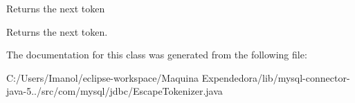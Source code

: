 Returns the next token

\begin{DoxyReturn}{Returns}
the next token. 
\end{DoxyReturn}


The documentation for this class was generated from the following file\+:\begin{DoxyCompactItemize}
\item 
C\+:/\+Users/\+Imanol/eclipse-\/workspace/\+Maquina Expendedora/lib/mysql-\/connector-\/java-\/5../src/com/mysql/jdbc/Escape\+Tokenizer.\+java\end{DoxyCompactItemize}
